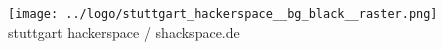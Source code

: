 \documentclass{article}
\begin{document}
    \pagestyle{plain}
    \vfill
    \centering
    \texttt{[image: ../logo/stuttgart\_hackerspace\_\_bg\_black\_\_raster.png]}\\\vspace{-2mm}
    \hspace{2mm}\Large\color{white} stuttgart hackerspace / shackspace.de
    \vfill
\end{document}
